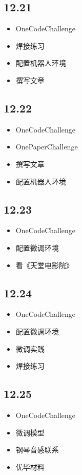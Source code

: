 \documentclass[UTF8]{ctexart}
\begin{document}
\subsection*{12.21}
\begin{itemize}
    \item OneCodeChallenge
    \item 焊接练习
    \item 配置机器人环境
    \item 撰写文章
\end{itemize}

\subsection*{12.22}
\begin{itemize}
    \item OneCodeChallenge
    \item OnePaperChallenge
    \item 撰写文章
    \item 配置机器人环境
\end{itemize}

\subsection*{12.23}
\begin{itemize}
    \item OneCodeChallenge
    \item 配置微调环境
    \item 看《天堂电影院》
\end{itemize}

\subsection*{12.24}
\begin{itemize}
    \item OneCodeChallenge
    \item 配置微调环境
    \item 微调实践
    \item 焊接练习
\end{itemize}

\subsection*{12.25}
\begin{itemize}
    \item OneCodeChallenge
    \item 微调模型
    \item 钢琴音感联系
    \item 优毕材料
\end{itemize}
\end{document}
